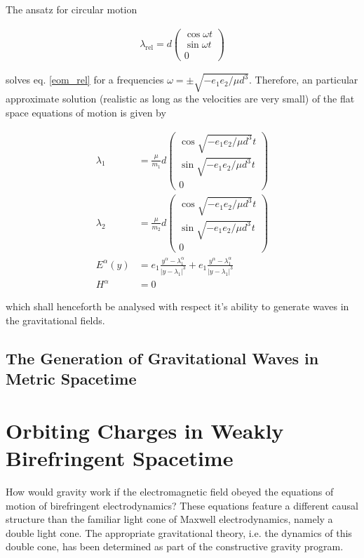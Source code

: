 \documentclass[11pt]{article}
\begin{document}
The ansatz for circular motion

\begin{align}
	\lambda_{\text{rel}}  
	= d\begin{pmatrix}
	\cos{\omega t}\\ \sin{\omega t}\\ 0
	\end{pmatrix}
\end{align}

solves eq. \ref{eom_rel} for a frequencies $\omega = \pm \sqrt{- e_1 e_2 / \mu d^3}$. Therefore, an particular approximate solution (realistic as long as the velocities are very small) of the flat space equations of motion is given by

\begin{align}
	\lambda_1 &= \frac{\mu}{m_1}
	d\begin{pmatrix}
	\cos{\sqrt{- e_1 e_2 / \mu d^3} t}\\ \sin{\sqrt{- e_1 e_2 / \mu d^3} t}\\ 0
	\end{pmatrix}\\
	\lambda_2 &= \frac{\mu}{m_2}
	d\begin{pmatrix}
	\cos{\sqrt{- e_1 e_2 / \mu d^3} t}\\ \sin{\sqrt{- e_1 e_2 / \mu d^3} t}\\ 0
	\end{pmatrix}\\
	E^\alpha \left( y \right) &= 
	e_1 \frac{y^\alpha - \lambda_1^\alpha }{\left| y - \lambda_1\right|^3} 
	+ e_1 \frac{y^\alpha - \lambda_1^\alpha }{\left| y - \lambda_1\right|^3} \\
	H^\alpha &= 0 
\end{align}

which shall henceforth be analysed with respect it's ability to generate waves in the gravitational fields.


\subsection{The Generation of Gravitational Waves in Metric Spacetime}



\section{Orbiting Charges in Weakly Birefringent Spacetime}

How would gravity work if the electromagnetic field obeyed the equations of motion of birefringent electrodynamics? These equations feature a different causal structure than the familiar light cone of Maxwell electrodynamics, namely a double light cone. The appropriate gravitational theory, i.e. the  dynamics of this double cone, has been determined as part of the constructive gravity program.
\end{document}

